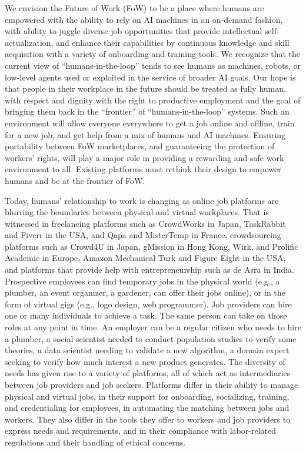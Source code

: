 \documentclass[11pt]{article}
\begin{document}
We envision the Future of Work (FoW) to be a place where humans are empowered with the ability to rely on AI machines in an on-demand fashion, with ability to juggle diverse job opportunities that provide intellectual self-actualization, and enhance their capabilities by continuous knowledge and skill acquisition with a variety of onboarding and training tools. We recognize that the current view of ``humans-in-the-loop'' tends to see humans as machines, robots, or low-level agents used or exploited in the service of broader AI goals. Our hope is that people in their workplace in the future should be treated as fully human, with respect and dignity with the right to productive employment and the goal of bringing them back in the ``frontier'' of ``humans-in-the-loop'' systems. Such an environment will allow everyone everywhere to get a job online and offline, train for a new job, and get help from a mix of humans and AI machines. Ensuring portability between FoW marketplaces, and guaranteeing the protection of workers' rights, will play a major role in providing a rewarding and safe work environment to all. Existing platforms must rethink their design to empower humans and be at the frontier of FoW.

Today, humans' relationship to work is changing as online job platforms are blurring the boundaries between physical and virtual workplaces. That is witnessed in freelancing platforms such as CrowdWorks in Japan, TaskRabbit and Fiverr in the USA, and Qapa and MisterTemp in France, crowdsourcing platforms such as Crowd4U in Japan, gMission in Hong Kong, Wirk, and Prolific Academic in Europe, Amazon Mechanical Turk and Figure Eight in the USA, and platforms that provide help with entrepreneurship such as de Asra in India. Prospective employees can find temporary jobs in the physical world (e.g., a plumber, an event organizer, a gardener, can offer their jobs online), or in the form of virtual gigs (e.g., logo design, web programmer). Job providers can hire one or many individuals to achieve a task. The same person can take on those roles at any point in time. An employer can be a regular citizen who needs to hire a plumber, a social scientist needed to conduct population studies to verify some theories, a data scientist needing to validate a new algorithm, a domain expert seeking to verify how much interest a new product generates. The diversity of needs has given rise to a variety of platforms, all of which act as intermediaries between job providers and job seekers. Platforms differ in their ability to manage physical and virtual jobs, in their support for onboarding, socializing, training, and credentialing for employees, in automating the matching between jobs and workers. They also differ in the tools they offer to workers and job providers to express needs and requirements, and in their compliance with labor-related regulations and their handling of ethical concerns. 
\end{document}
